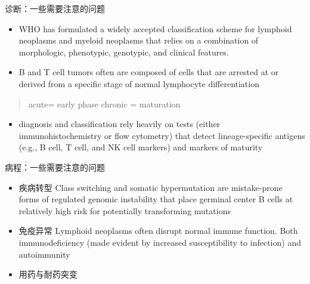 \documentclass[
  ignorenonframetext,
]{beamer}
\providecommand{\tightlist}{%
  \setlength{\itemsep}{0pt}\setlength{\parskip}{0pt}}
\begin{document}
\begin{frame}
\begin{block}{诊断：一些需要注意的问题}
\protect\hypertarget{ux8bcaux65adux4e00ux4e9bux9700ux8981ux6ce8ux610fux7684ux95eeux9898}{}
\begin{itemize}
\item
  WHO has formulated a widely accepted classification scheme for
  lymphoid neoplasms and myeloid neoplasms that relies on a combination
  of morphologic, phenotypic, genotypic, and clinical features.
\item
  B and T cell tumors often are composed of cells that are arrested at
  or derived from a specific stage of normal lymphocyte differentiation
\end{itemize}

\begin{quote}
acute= early phase chronic = maturation
\end{quote}

\begin{itemize}
\tightlist
\item
  diagnosis and classification rely heavily on tests (either
  immunohistochemistry or flow cytometry) that detect lineage-specific
  antigens (e.g., B cell, T cell, and NK cell markers) and markers of
  maturity
\end{itemize}
\end{block}
\end{frame}

\begin{frame}
\begin{block}{病程：一些需要注意的问题}
\protect\hypertarget{ux75c5ux7a0bux4e00ux4e9bux9700ux8981ux6ce8ux610fux7684ux95eeux9898}{}
\begin{itemize}
\item
  疾病转型 Class switching and somatic hypermutation are mistake-prone
  forms of regulated genomic instability that place germinal center B
  cells at relatively high risk for potentially transforming mutations
\item
  免疫异常 Lymphoid neoplasms often disrupt normal immune function. Both
  immunodeficiency (made evident by increased susceptibility to
  infection) and autoimmunity
\item
  用药与耐药突变
\end{itemize}
\end{block}
\end{frame}
\end{document}
